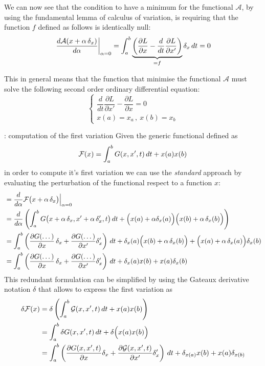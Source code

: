 We can now see that the condition to have a minimum for the functional $\mathcal A$, by using the fundamental lemma of calculus of variation, is requiring that the function $f$ defined as follows is identically null:
\begin{equation} \label{eq:func:var1}
	\left. \frac{d\mathcal A(x+\alpha\, \delta_x)}{d\alpha} \right|_{\alpha = 0} = \int_a^b \underbrace{\left(\frac{\partial L }{\partial x} - \frac d{dt}\frac{\partial L }{\partial x'}\right)}_{=f} \delta_x \, dt = 0
\end{equation}

This in general means that the function that minimise the functional $\mathcal A$ must solve the following second order ordinary differential equation:
\[ \begin{cases}
	\dfrac d{dt} \dfrac{\partial L }{\partial x'} - \dfrac {\partial L }{\partial x} = 0 \\ x(a) = x_a \, ,\ x(b) = x_b
\end{cases} \]

\begin{example}{: computation of the first variation}
	Given the generic functional defined as
	\[ \mathcal{F}(x) = \int_a^b G(x,x',t)\, dt + x(a)x(b) \]
	in order to compute it's first variation we can use the \textit{standard} approach by evaluating the perturbation of the functional respect to a function $x$:
	\begin{align*}
		&= \frac d{d\alpha} \mathcal F \big(x+\alpha\, \delta_x\big) \Big|_{\alpha=0} \\
		&= \frac{d}{d\alpha}\left( \int_a^b  G  \big(x+\alpha\, \delta_x, x' + \alpha\, \delta_x',t\big)\, dt  + \Big(x(a) + \alpha \delta_x(a)\Big)\Big(x(b) + \alpha\, \delta_x(b)\Big) \right) \\
		&=  \int_a^b \left( \frac{\partial  G  (\dots)}{\partial x} \, \delta_x + \frac{\partial  G  (\dots)}{\partial x'} \delta_x' \right) \, dt  + \delta_x(a) \Big(x(b) + \alpha\, \delta_x(b)\Big) + \Big( x(a) + \alpha\,\delta_x(a) \Big)\delta_x(b) \\
		&=  \int_a^b \left( \frac{\partial  G  (\dots)}{\partial x} \, \delta_x + \frac{\partial  G  (\dots)}{\partial x'} \delta_x' \right) \, dt  + \delta_x(a)x(b) + x(a)\delta_x(b)
	\end{align*}
	This redundant formulation can be simplified by using the Gateaux derivative notation $\delta$ that allows to express the first variation as
	\begin{align*}
		\delta \mathcal F(x) & = \delta \left(\int_a^b \mathcal{G}(x,x',t)\, dt + x(a)x(b)\right) \\
		&= \int_a^b \delta  G  (x,x',t)\, dt + \delta \Big(x(a) x(b) \Big)\\ 
		&= \int_a^b \left( \frac{\partial  G  (x,x',t)}{\partial x}\delta_x + \frac{\partial \mathcal G(x,x',t)}{\partial x'} \delta_x' \right)\, dt + \delta_{x(a)} x(b) + x(a)\delta_{x(b)}
	\end{align*}
\end{example}


